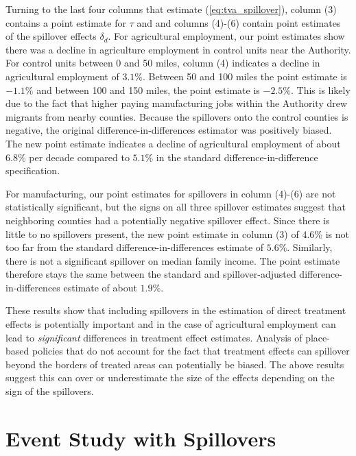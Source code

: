 \documentclass[11pt]{article}
\begin{document}
Turning to the last four columns that estimate (\ref{eq:tva_spillover}), column (3) contains a point estimate for $\tau$ and and columns (4)-(6) contain point estimates of the spillover effects $\delta_d$. For agricultural employment, our point estimates show there was a decline in agriculture employment in control units near the Authority. For control units between 0 and 50 miles, column (4) indicates a decline in agricultural employment of $3.1\%$. Between 50 and 100 miles the point estimate is $-1.1\%$ and between 100 and 150 miles, the point estimate is $-2.5\%$. This is likely due to the fact that higher paying manufacturing jobs within the Authority drew migrants from nearby counties. Because the spillovers onto the control counties is negative, the original difference-in-differences estimator was positively biased. The new point estimate indicates a decline of agricultural employment of about $6.8\%$ per decade compared to $5.1\%$ in the standard difference-in-difference specification. 

For manufacturing, our point estimates for spillovers in column (4)-(6) are not statistically significant, but the signs on all three spillover estimates suggest that neighboring counties had a potentially negative spillover effect. Since there is little to no spillovers present, the new point estimate in column (3) of $4.6\%$ is not too far from the standard difference-in-differences estimate of $5.6\%$. Similarly, there is not a significant spillover on median family income. The point estimate therefore stays the same between the standard and spillover-adjusted difference-in-differences estimate of about $1.9\%$. 

These results show that including spillovers in the estimation of direct treatment effects is potentially important and in the case of agricultural employment can lead to \emph{significant} differences in treatment effect estimates. Analysis of place-based policies that do not account for the fact that treatment effects can spillover beyond the borders of treated areas can potentially be biased. The above results suggest this can over or underestimate the size of the effects depending on the sign of the spillovers. 



\section{Event Study with Spillovers}
\label{sec:event_study}
\end{document}
